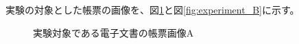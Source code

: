 実験の対象とした帳票の画像を、図\ref{fig:experiment_A}と図\ref{fig:experiment_B}に示す。
\begin{figure}[tp]
    \begin{center}
        \caption{実験対象である電子文書の帳票画像A}
        \label{fig:experiment_A}
    \end{center}
\end{figure}

